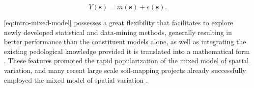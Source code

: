 \begin{equation}\label{eq:intro-mixed-model}
Y(\boldsymbol{s}) = m(\boldsymbol{s}) + e(\boldsymbol{s}).
\end{equation}

\autoref{eq:intro-mixed-model} possesses a great flexibility that facilitates to explore newly developed 
statistical and 
data-mining methods, generally resulting in better performance than the constituent models alone, as well as 
integrating the 
existing pedological knowledge provided it is translated into a mathematical form \cite{OdehEtAl1994, 
OdehEtAl1995, 
Heuvelink1996, McBratneyEtAl2000, HenglEtAl2004, Lopez-GranadosEtAl2005, WebsterEtAl2007, Grunwald2009, 
Lark2012}. These features promoted the rapid popularization of the mixed model of spatial variation, and many 
recent large scale soil-mapping projects already successfully employed the mixed model of spatial variation 
\cite{PoggioEtAl2014, NussbaumEtAl2014, HenglEtAl2015}.


